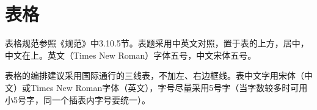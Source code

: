 %
%
%
%
%
%
%
%
%



\section{表格}

表格规范参照《规范》中3.10.5节。表题采用中英文对照，置于表的上方，居中，中文在上。英文（Times New Roman）字体五号，中文宋体五号。 

表格的编排建议采用国际通行的三线表，不加左、右边框线。表中文字用宋体（中文）或Times New Roman字体（英文），字号尽量采用5号字（当字数较多时可用小5号字，同一个插表内字号要统一）。

